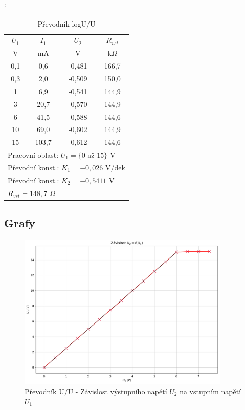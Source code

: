 \documentclass[a4paper, czech]{article}
\begin{document}
\begin{table}[H]
    \catcode`
    \centering
    \caption{Převodník logU/U}
    \begin{tabular}{cccc}
        \toprule
        $U_1$  & $I_1$  & $U_2$    & $R_{vst}$ \\
        \cmidrule(rl){1-1}
        \cmidrule(rl){2-2}
        \cmidrule(rl){3-3}
        \cmidrule(rl){4-4}
        V   & mA  & V     & k$\Omega$ \\
        \midrule
        0,1 & 0,6   & -0,481 & 166,7 \\
        0,3 & 2,0   & -0,509 & 150,0 \\
        1   & 6,9   & -0,541 & 144,9 \\
        3   & 20,7  & -0,570 & 144,9 \\
        6   & 41,5  & -0,588 & 144,6 \\
        10  & 69,0  & -0,602 & 144,9 \\
        15  & 103,7 & -0,612 & 144,6 \\
        \bottomrule
        \multicolumn{4}{l}{Pracovní oblast: $U_1 = \{0$ až $15\}$ V} \\
        \multicolumn{4}{l}{Převodní konst.: $K_1 = -0,026$ V/dek} \\
        \multicolumn{4}{l}{Převodní konst.: $K_2 = -0,5411$ V} \\
        \multicolumn{4}{l}{$R_{vst} = 148,7$ $\Omega$} \\
    \end{tabular}
\end{table}

\subsection{Grafy}

\begin{figure}[H]
    \centering
    \includegraphics[width=0.9\textwidth]{grafy/graf_prevodnik_UU.pdf}
    \caption{Převodník U/U - Závislost výstupního napětí $U_2$ na vstupním napětí $U_1$}
\end{figure}
\end{document}
